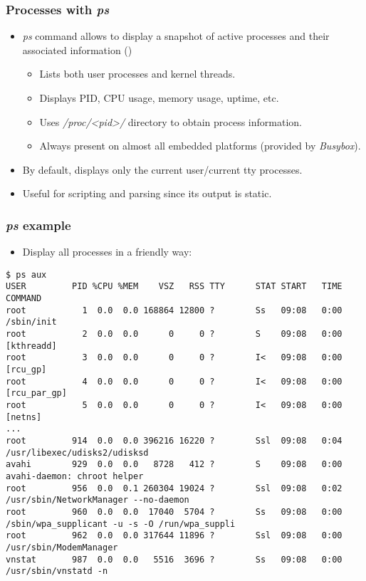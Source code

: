 \begin{frame}[fragile]
  \frametitle{Processes with {\em ps}}
  \begin{itemize}
    \item {\em ps} command allows to display a snapshot of active processes and
          their associated information ()
    \begin{itemize}
      \item Lists both user processes and kernel threads.
      \item Displays PID, CPU usage, memory usage, uptime, etc.
    \end{itemize}
    \begin{itemize}
      \item Uses {\em /proc/<pid>/} directory to obtain process information.
      \item Always present on almost all embedded platforms (provided by
            {\em Busybox}).
    \end{itemize}
    \item By default, displays only the current user/current tty processes.
    \item Useful for scripting and parsing since its output is static.
  \end{itemize}
\end{frame}

\begin{frame}[fragile]
  \frametitle{{\em ps} example}
  \begin{itemize}
  \frametitle{Processes with {\em ps}}
    \item Display all processes in a friendly way:
  \end{itemize}
  \begin{block}{}
    \begin{verbatim}
$ ps aux
USER         PID %CPU %MEM    VSZ   RSS TTY      STAT START   TIME COMMAND
root           1  0.0  0.0 168864 12800 ?        Ss   09:08   0:00 /sbin/init
root           2  0.0  0.0      0     0 ?        S    09:08   0:00 [kthreadd]
root           3  0.0  0.0      0     0 ?        I<   09:08   0:00 [rcu_gp]
root           4  0.0  0.0      0     0 ?        I<   09:08   0:00 [rcu_par_gp]
root           5  0.0  0.0      0     0 ?        I<   09:08   0:00 [netns]
...
root         914  0.0  0.0 396216 16220 ?        Ssl  09:08   0:04 /usr/libexec/udisks2/udisksd
avahi        929  0.0  0.0   8728   412 ?        S    09:08   0:00 avahi-daemon: chroot helper
root         956  0.0  0.1 260304 19024 ?        Ssl  09:08   0:02 /usr/sbin/NetworkManager --no-daemon
root         960  0.0  0.0  17040  5704 ?        Ss   09:08   0:00 /sbin/wpa_supplicant -u -s -O /run/wpa_suppli
root         962  0.0  0.0 317644 11896 ?        Ssl  09:08   0:00 /usr/sbin/ModemManager
vnstat       987  0.0  0.0   5516  3696 ?        Ss   09:08   0:00 /usr/sbin/vnstatd -n
    \end{verbatim}
  \end{block}
\end{frame}

